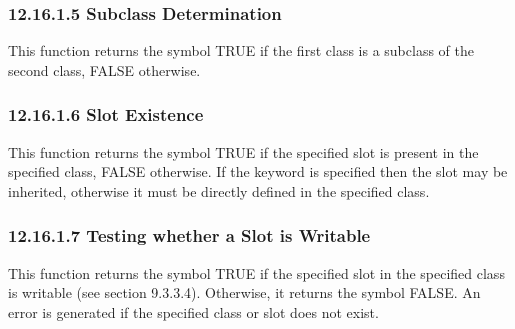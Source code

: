 \documentclass[letterpaper,10pt,english]{sphinxmanual}
\begin{document}

\begin{sphinxVerbatim}[commandchars=\\\{\}]
  
\end{sphinxVerbatim}


\subsubsection{12.16.1.5 Subclass Determination}
\label{\detokenize{actions:subclass-determination}}
This function returns the symbol TRUE if the first class is a subclass
of the second class, FALSE otherwise.


\begin{sphinxVerbatim}[commandchars=\\\{\}]
  
\end{sphinxVerbatim}


\subsubsection{12.16.1.6 Slot Existence}
\label{\detokenize{actions:slot-existence}}
This function returns the symbol TRUE if the specified slot is present
in the specified class, FALSE otherwise. If the  keyword is
specified then the slot may be inherited, otherwise it must be directly
defined in the specified class.


\begin{sphinxVerbatim}[commandchars=\\\{\}]
   \PYG{p}{[}\PYG{p}{]}
\end{sphinxVerbatim}


\subsubsection{12.16.1.7 Testing whether a Slot is Writable}
\label{\detokenize{actions:testing-whether-a-slot-is-writable}}
This function returns the symbol TRUE if the specified slot in the
specified class is writable (see section 9.3.3.4). Otherwise, it returns
the symbol FALSE. An error is generated if the specified class or slot
does not exist.
\end{document}
